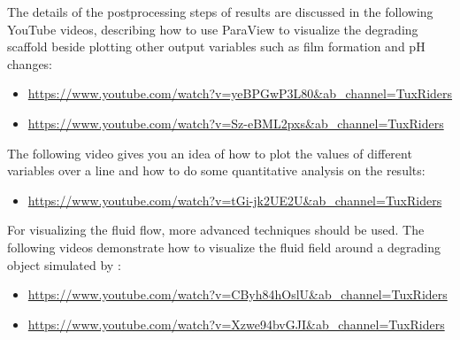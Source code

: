 The details of the postprocessing steps of \biodeg{} results are discussed in the following YouTube videos, describing how to use ParaView to visualize the degrading scaffold beside plotting other output variables such as film formation and pH changes:

\begin{itemize}
\item 
\url{https://www.youtube.com/watch?v=yeBPGwP3L80&ab_channel=TuxRiders}
\item
\url{https://www.youtube.com/watch?v=Sz-eBML2pxs&ab_channel=TuxRiders}
\end{itemize}

The following video gives you an idea of how to plot the values of different variables over a line and how to do some quantitative analysis on the results:

\begin{itemize}
\item 
\url{https://www.youtube.com/watch?v=tGi-jk2UE2U&ab_channel=TuxRiders}
\end{itemize}

For visualizing the fluid flow, more advanced techniques should be used. The following videos demonstrate how to visualize the fluid field around a degrading object simulated by \biodeg{}:

\begin{itemize}
\item
\url{https://www.youtube.com/watch?v=CByh84hOslU&ab_channel=TuxRiders}
\item
\url{https://www.youtube.com/watch?v=Xzwe94bvGJI&ab_channel=TuxRiders}
\end{itemize}